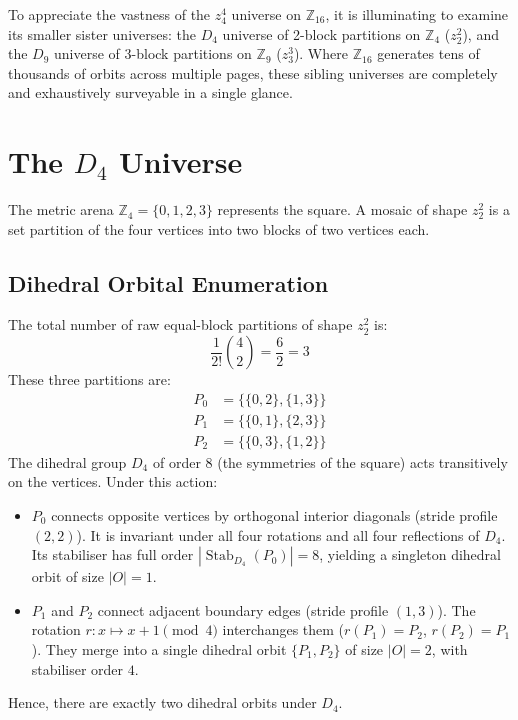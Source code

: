 
To appreciate the vastness of the $z_4^4$ universe on $\mathbb{Z}_{16}$, it is illuminating to examine its smaller sister universes: the $D_4$ universe of 2-block partitions on $\mathbb{Z}_4$ ($z_2^2$), and the $D_9$ universe of 3-block partitions on $\mathbb{Z}_9$ ($z_3^3$). Where $\mathbb{Z}_{16}$ generates tens of thousands of orbits across multiple pages, these sibling universes are completely and exhaustively surveyable in a single glance.

\section{The \texorpdfstring{$D_4$}{D4} Universe}
\label{sec:d4-universe}

The metric arena $\mathbb{Z}_4 = \{0, 1, 2, 3\}$ represents the square. A mosaic of shape $z_2^2$ is a set partition of the four vertices into two blocks of two vertices each.

\subsection{Dihedral Orbital Enumeration}

The total number of raw equal-block partitions of shape $z_2^2$ is:
\[
\frac{1}{2!}\binom{4}{2} = \frac{6}{2} = 3
\]
These three partitions are:
\begin{align*}
P_0 &= \{\{0, 2\}, \{1, 3\}\} \\
P_1 &= \{\{0, 1\}, \{2, 3\}\} \\
P_2 &= \{\{0, 3\}, \{1, 2\}\}
\end{align*}
The dihedral group $D_4$ of order $8$ (the symmetries of the square) acts transitively on the vertices. Under this action:
\begin{itemize}
    \item $P_0$ connects opposite vertices by orthogonal interior diagonals (stride profile $(2, 2)$). It is invariant under all four rotations and all four reflections of $D_4$. Its stabiliser has full order $|\operatorname{Stab}_{D_4}(P_0)| = 8$, yielding a singleton dihedral orbit of size $|O| = 1$.
    \item $P_1$ and $P_2$ connect adjacent boundary edges (stride profile $(1, 3)$). The rotation $r \colon x \mapsto x + 1 \pmod 4$ interchanges them ($r(P_1) = P_2$, $r(P_2) = P_1$). They merge into a single dihedral orbit $\{P_1, P_2\}$ of size $|O| = 2$, with stabiliser order $4$.
\end{itemize}
Hence, there are exactly two dihedral orbits under $D_4$.


